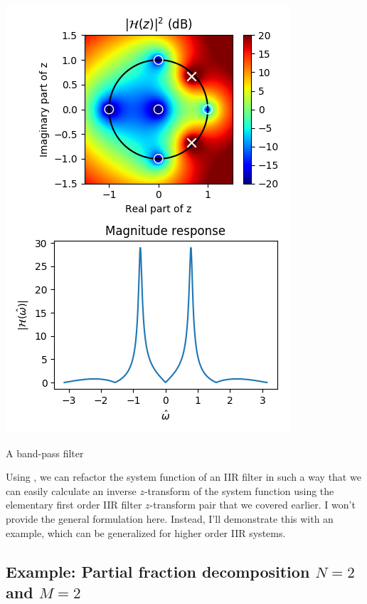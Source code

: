 \begin{marginfigure}
\includegraphics[width=\textwidth]{code/026_iir/ex6.png}
\caption{A band-pass filter}
\label{fig:pzex4}
\end{marginfigure}

Using \emph{}, we can refactor the system function of an IIR filter
in such a way that we can easily calculate an inverse $z$-transform of
the system function using the elementary first order IIR filter
$z$-transform pair that we covered earlier. I won't provide the general
formulation here. Instead, I'll demonstrate this with an example,
which can be generalized for higher order IIR systems.

\subsection{Example: Partial fraction decomposition $N=2$ and $M=2$}

